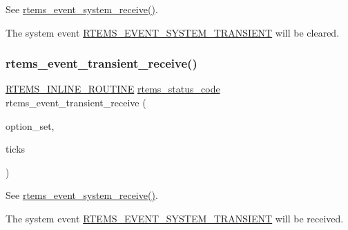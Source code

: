 See \mbox{\hyperlink{group__ClassicEventSystem_ga10c79eebe1e9c1b00eb72017bb67daf7}{rtems\+\_\+event\+\_\+system\+\_\+receive()}}. 

The system event \mbox{\hyperlink{group__ClassicEventSystem_gace35bdbb8d804a49ca2d5eff5a90e214}{R\+T\+E\+M\+S\+\_\+\+E\+V\+E\+N\+T\+\_\+\+S\+Y\+S\+T\+E\+M\+\_\+\+T\+R\+A\+N\+S\+I\+E\+NT}} will be cleared. \mbox{\label{group__ClassicEventTransient_ga9a9d65005be8b07ee557eef07de4b501}} 
\subsubsection{\texorpdfstring{rtems\_event\_transient\_receive()}{rtems\_event\_transient\_receive()}}
{\footnotesize\ttfamily \mbox{\hyperlink{group__RTEMSScoreBaseDefs_gac216239df231d5dbd15e3520b0b9313f}{R\+T\+E\+M\+S\+\_\+\+I\+N\+L\+I\+N\+E\+\_\+\+R\+O\+U\+T\+I\+NE}} \mbox{\hyperlink{group__ClassicStatus_ga545d41846817eaba6143d52ee4d9e9fe}{rtems\+\_\+status\+\_\+code}} rtems\+\_\+event\+\_\+transient\+\_\+receive (\begin{DoxyParamCaption}\item[{\mbox{\hyperlink{group__ClassicOptions_gad26685eb0e60a9650082935c31920e29}{rtems\+\_\+option}}}]{option\+\_\+set,  }\item[{\mbox{\hyperlink{group__ClassicTasks_gad39c43f949683d46874e3a5586b93aee}{rtems\+\_\+interval}}}]{ticks }\end{DoxyParamCaption})}



See \mbox{\hyperlink{group__ClassicEventSystem_ga10c79eebe1e9c1b00eb72017bb67daf7}{rtems\+\_\+event\+\_\+system\+\_\+receive()}}. 

The system event \mbox{\hyperlink{group__ClassicEventSystem_gace35bdbb8d804a49ca2d5eff5a90e214}{R\+T\+E\+M\+S\+\_\+\+E\+V\+E\+N\+T\+\_\+\+S\+Y\+S\+T\+E\+M\+\_\+\+T\+R\+A\+N\+S\+I\+E\+NT}} will be received. \mbox{\label{group__ClassicEventTransient_gab2d8a49e579d5eb1f71f499230ed9808}} 
